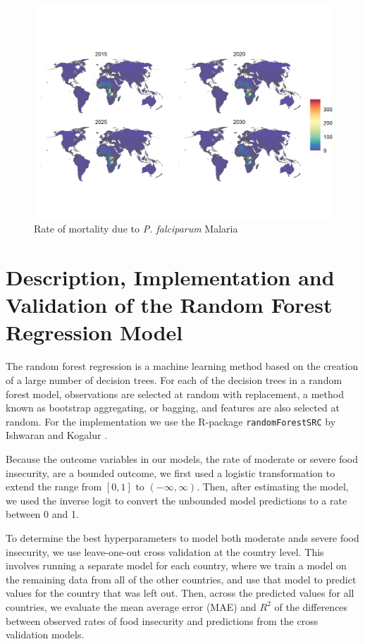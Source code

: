 \documentclass{article}
\begin{document}
\begin{figure}[H]
  \centering
  \includegraphics[width=\linewidth]{img/covars/mal_falciparum.png}
  \caption{Rate of mortality due to \textit{P. falciparum} Malaria}
\end{figure}

\pagebreak
\section{Description, Implementation and Validation of the Random Forest Regression Model}
The random forest regression is a machine learning method based on the creation of a large number of decision trees.  For each of the decision trees in a random forest model, observations are selected at random with replacement, a method known as bootstrap aggregating, or bagging, and features are also selected at random.  For the implementation we use the R-package \texttt{randomForestSRC} by Ishwaran and Kogalur \citep{ishwaran2019randomforestsrc}.

Because the outcome variables in our models, the rate of moderate or severe food insecurity, are a bounded outcome, we first used a logistic transformation to extend the range from $[0,1]$ to $(-\infty, \infty)$.  Then, after estimating the model, we used the inverse logit to convert the unbounded model predictions to a rate between 0 and 1.

To determine the best hyperparameters to model both moderate ands severe food insecurity, we use leave-one-out cross validation at the country level.  This involves running a separate model for each country, where we train a model on the remaining data from all of the other countries, and use that model to predict values for the country that was left out.  Then, across the predicted values for all countries, we evaluate the mean average error (MAE) and $R^2$ of the differences between observed rates of food insecurity and predictions from the cross validation models.
\end{document}
